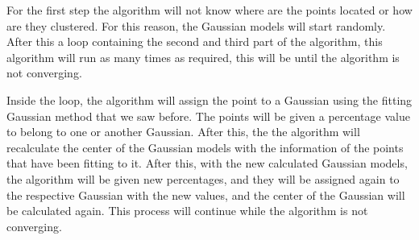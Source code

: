 \documentclass[conference]{IEEEtran}
\begin{document}
For the first step the algorithm will not know where are the points located or how are they clustered. For this reason, the Gaussian models will start randomly. After this a loop containing the second and third part of the algorithm, this algorithm will run as many times as required, this will be until the algorithm is not converging.

Inside the loop, the algorithm will assign the point to a Gaussian using the fitting Gaussian method that we saw before. The points will be given a percentage value to belong to one or another Gaussian. After this, the the algorithm will recalculate the center of the Gaussian models with the information of the points that have been fitting to it. After this, with the new calculated Gaussian models, the algorithm will be given new percentages, and they will be assigned again to the respective Gaussian with the new values, and the center of the Gaussian will be calculated again. This process will continue while the algorithm is not converging.


%
%
\end{document}
